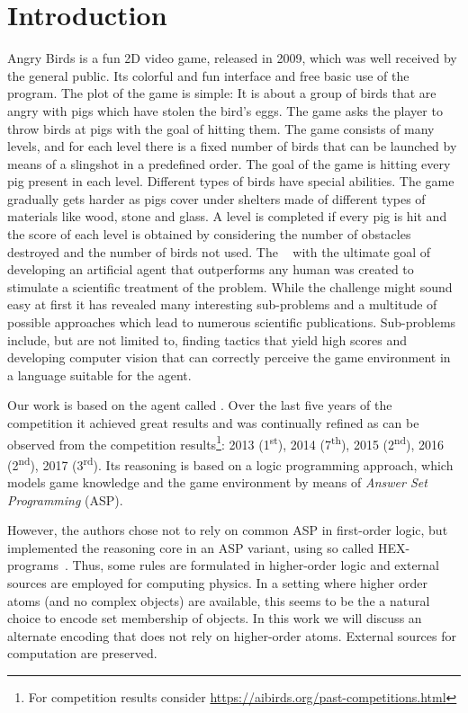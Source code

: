 \section{Introduction}
\label{sec:intro}

Angry Birds is a fun 2D video game, released in 2009, which was well received by the general public. Its colorful and fun interface and free basic use of
the program. The plot of the game is simple: It is about a group of birds that are angry with pigs which have stolen the bird's eggs. The game asks the player to throw birds at pigs with the goal of hitting them. The game consists of many levels, and for each level there is a fixed number of birds that can be launched by means of a slingshot in a predefined order. The goal of the game is hitting every pig present in each level. Different types of birds have special abilities. The game gradually gets harder as pigs cover under shelters made of different types of materials like wood, stone and glass. A level is completed if every pig is hit and the score of each level is obtained by considering the number of obstacles destroyed and the number of birds not used.
The \abc~\cite{angryAI} with the ultimate goal of developing an artificial agent that outperforms any human was created to stimulate a scientific treatment of the problem. While the challenge might sound easy at first it has revealed many interesting sub-problems and a multitude of possible approaches which lead to numerous scientific publications.
Sub-problems include, but are not limited to, finding tactics that yield high scores and developing computer vision that can correctly perceive the game environment in a language suitable for the agent.

Our work is based on the agent called \ah \cite{angryhex}. Over the last five years of the competition it achieved great results and was continually refined as can be observed from the competition results\footnote{For competition results consider \url{https://aibirds.org/past-competitions.html}}: 2013 (1\textsuperscript{st}), 2014 (7\textsuperscript{th}), 2015 (2\textsuperscript{nd}), 2016 (2\textsuperscript{nd}), 2017 (3\textsuperscript{rd}). Its reasoning is based on a logic programming approach, which models game knowledge and the game environment by means of \emph{Answer Set Programming} (ASP).

However, the authors chose not to rely on common ASP in first-order logic, but implemented the reasoning core in an ASP variant, using so called HEX-programs~\cite{hex}. Thus, some rules are formulated in higher-order logic and external sources are employed for computing physics. In a setting where higher order atoms (and no complex objects) are available, this seems to be the a natural choice to encode set membership of objects. In this work we will discuss an alternate encoding that does not rely on higher-order atoms. External sources for computation are preserved.

